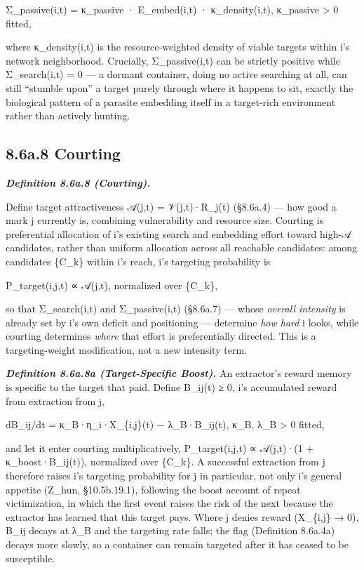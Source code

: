 \documentclass[
]{article}
\begin{document}
Σ\_passive(i,t) = κ\_passive · E\_embed(i,t) · κ\_density(i,t),
κ\_passive \textgreater{} 0 fitted,

where κ\_density(i,t) is the resource-weighted density of viable targets
within i's network neighborhood. Crucially, Σ\_passive(i,t) can be
strictly positive while Σ\_search(i,t) = 0 --- a dormant container,
doing no active searching at all, can still ``stumble upon'' a target
purely through where it happens to sit, exactly the biological pattern
of a parasite embedding itself in a target-rich environment rather than
actively hunting.

\hypertarget{a.8-courting}{%
\subsection{8.6a.8 Courting}\label{a.8-courting}}

\emph{\textbf{Definition 8.6a.8 (Courting).}}

Define target attractiveness 𝒜(j,t) = 𝒱(j,t)·R\_j(t) (§8.6a.4) --- how
good a mark j currently is, combining vulnerability and resource size.
Courting is preferential allocation of i's existing search and embedding
effort toward high-𝒜 candidates, rather than uniform allocation across
all reachable candidates: among candidates \{C\_k\} within i's reach,
i's targeting probability is

P\_target(i,j,t) ∝ 𝒜(j,t), normalized over \{C\_k\},

so that Σ\_search(i,t) and Σ\_passive(i,t) (§8.6a.7) --- whose
\emph{overall intensity} is already set by i's own deficit and
positioning --- determine \emph{how hard} i looks, while courting
determines \emph{where} that effort is preferentially directed. This is
a targeting-weight modification, not a new intensity term.

\emph{\textbf{Definition 8.6a.8a (Target-Specific Boost).}} An
extractor's reward memory is specific to the target that paid. Define
B\_ij(t) ≥ 0, i's accumulated reward from extraction from j,

dB\_ij/dt = κ\_B·η\_i·X\_\{i,j\}(t) − λ\_B·B\_ij(t), κ\_B, λ\_B
\textgreater{} 0 fitted,

and let it enter courting multiplicatively, P\_target(i,j,t) ∝ 𝒜(j,t)·(1
+ κ\_boost·B\_ij(t)), normalized over \{C\_k\}. A successful extraction
from j therefore raises i's targeting probability for j in particular,
not only i's general appetite (Z\_hun, §10.5b.19.1), following the boost
account of repeat victimization, in which the first event raises the
risk of the next because the extractor has learned that this target
pays. Where j denies reward (X\_\{i,j\} → 0), B\_ij decays at λ\_B and
the targeting rate falls; the flag (Definition 8.6a.4a) decays more
slowly, so a container can remain targeted after it has ceased to be
susceptible.
\end{document}
